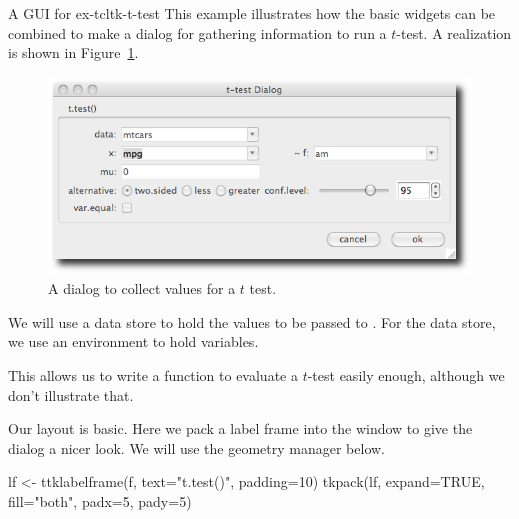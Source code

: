 
\begin{example}{A GUI for }{ex-tcltk-t-test}
This example illustrates how the basic widgets can be combined to make
a dialog for gathering information to run a $t$-test. A realization is shown in Figure~\ref{fig:fig-tcltk-t-test}.

\begin{figure}
  \centering
  \includegraphics[width=.75\textwidth]{fig-tcltk-t-test.png}
  \caption{A dialog to collect values for a $t$ test.}
  \label{fig:fig-tcltk-t-test}
\end{figure}





We will use a data store to hold the values to be passed to
. For the data store, we  use an environment to hold \Tcl\/ variables.

\begin{Schunk}
\end{Schunk}

This allows us to write a function to evaluate a $t$-test easily
enough, although we don't illustrate that.






Our layout is basic. Here we pack a label frame into the window to give the dialog a nicer look.
We will use the  geometry manager below.
\begin{Schunk}
\begin{Sinput}
 lf <- ttklabelframe(f, text="t.test()", padding=10)
 tkpack(lf, expand=TRUE, fill="both", padx=5, pady=5)
\end{Sinput}
\end{Schunk}



\end{example}
